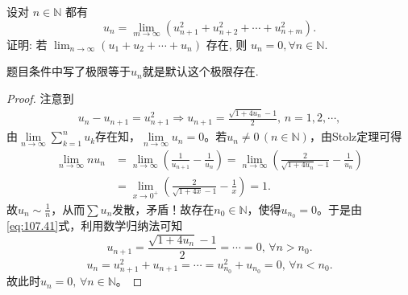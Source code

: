 \documentclass[../../main.tex]{subfiles}%
\begin{document}
\begin{example}
设对 \( n \in \mathbb{N} \) 都有
\[
u_n = \lim_{m \to \infty} (u_{n+1}^2 + u_{n+2}^2 + \cdots + u_{n+m}^2).
\]
证明: 若 \( \lim_{n \to \infty} (u_1 + u_2 + \cdots + u_n) \) 存在, 则 \( u_n = 0, \forall n \in \mathbb{N} \).
\end{example}
\begin{remark}
题目条件中写了极限等于$u_n$就是默认这个极限存在.
\end{remark}
\begin{proof}
注意到
\begin{align}
u_n - u_{n+1} = u_{n+1}^2 \Longrightarrow u_{n+1} = \frac{\sqrt{1 + 4u_n} - 1}{2}, \, n = 1, 2, \cdots, \label{eq:107.41}
\end{align}
由$\lim\limits_{n \to \infty} \sum_{k=1}^n u_k$存在知，$\lim\limits_{n \to \infty} u_n = 0$。若$u_n \neq 0 \, (n \in \mathbb{N})$，由Stolz定理可得
\begin{align*}
\lim_{n \to \infty} n u_n &= \lim_{n \to \infty} \left( \frac{1}{u_{n+1}} - \frac{1}{u_n} \right) = \lim_{n \to \infty} \left( \frac{2}{\sqrt{1 + 4u_n} - 1} - \frac{1}{u_n} \right) \\
&= \lim_{x \to 0^+} \left( \frac{2}{\sqrt{1 + 4x} - 1} - \frac{1}{x} \right) = 1.
\end{align*}
故$u_n \sim \frac{1}{n}$，从而$\sum u_n$发散，矛盾！故存在$n_0 \in \mathbb{N}$，使得$u_{n_0} = 0$。于是由\eqref{eq:107.41}式，利用数学归纳法可知
\[
u_{n+1} = \frac{\sqrt{1 + 4u_n} - 1}{2} = \cdots = 0, \, \forall n > n_0.
\]
\[
u_n = u_{n+1}^2 + u_{n+1} = \cdots = u_{n_0}^2 + u_{n_0} = 0, \, \forall n < n_0.
\]
故此时$u_n = 0, \, \forall n \in \mathbb{N}$。
\end{proof}
\end{document}

